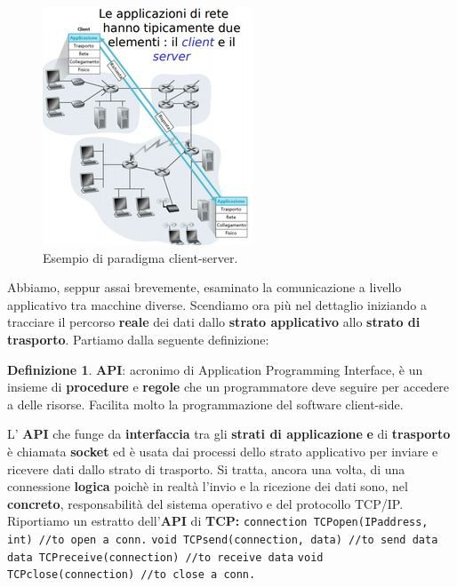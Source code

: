 \documentclass[11pt,a4paper]{article}
\theoremstyle{definition}
\newtheorem{definition}{Definizione}[section]
\begin{document}
\begin{figure}[!h]
	\includegraphics[scale=0.5]{Immagini/Client_server.png}
	\centering
	\caption{Esempio di paradigma client-server.}
\end{figure}
\newpage
Abbiamo, seppur assai brevemente, esaminato la comunicazione a livello applicativo tra macchine diverse. Scendiamo ora più nel dettaglio iniziando a tracciare il percorso \textbf{reale} dei dati dallo \textbf{strato applicativo} allo \textbf{strato di trasporto}. Partiamo dalla seguente definizione:

\theoremstyle{definition}
\begin{definition}
	\textbf{API}: acronimo di Application Programming Interface, è un insieme di \textbf{procedure} e \textbf{regole} che un programmatore deve seguire per accedere a delle risorse. Facilita molto la programmazione del software client-side.
\end{definition}
L' \textbf{API} che funge da \textbf{interfaccia} tra gli \textbf{strati di applicazione} \textbf{e} di \textbf{trasporto} è chiamata \textbf{socket} ed è usata dai processi dello strato applicativo per inviare e ricevere dati dallo strato di trasporto. Si tratta, ancora una volta, di una connessione \textbf{logica} poichè in realtà l'invio e la ricezione dei dati sono, nel \textbf{concreto}, responsabilità del sistema operativo e del protocollo TCP/IP.\newline
Riportiamo un estratto dell'\textbf{API} di \textbf{TCP:}\newline\newline
\texttt{connection TCPopen(IPaddress, int) //to open a conn.}\newline
\texttt{void TCPsend(connection, data) //to send data}\newline
\texttt{data TCPreceive(connection) //to receive data}\newline
\texttt{void TCPclose(connection) //to close a conn.}
\end{document}
